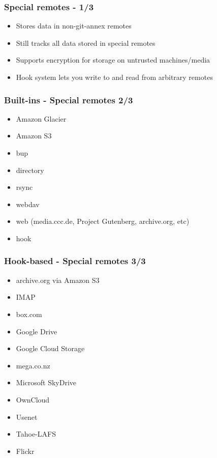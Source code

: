 \documentclass[t]{beamer}
\begin{document}
\begin{frame}
	\frametitle{Special remotes - 1/3}
	\begin{itemize}
		\item Stores data in non-git-annex remotes
		\item Still tracks all data stored in special remotes
		\item Supports encryption for storage on untrusted machines/media
		\item Hook system lets you write to and read from arbitrary remotes
	\end{itemize}
\end{frame}

\begin{frame}
	\frametitle{Built-ins - Special remotes 2/3}
	\begin{itemize}
		\item Amazon Glacier
		\item Amazon S3
		\item bup
		\item directory
		\item rsync
		\item webdav
		\item web (media.ccc.de, Project Gutenberg, archive.org, etc)
		\item hook
	\end{itemize}
\end{frame}

\begin{frame}
	\frametitle{Hook-based - Special remotes 3/3}
	\begin{itemize}
		\item archive.org via Amazon S3
		\item IMAP
		\item box.com
		\item Google Drive
		\item Google Cloud Storage
		\item mega.co.nz
		\item Microsoft SkyDrive
		\item OwnCloud
		\item Usenet
		\item Tahoe-LAFS
		\item Flickr
	\end{itemize}
\end{frame}
\end{document}
